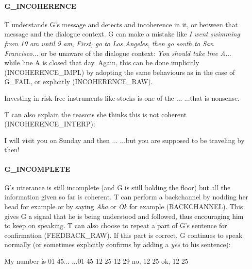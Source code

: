 				\paragraph{G\_INCOHERENCE} T understands G's message and detects and incoherence in it, or between that message and the dialogue context. G can make a mistake like \textit{I went swimming from 10 am until 9 am}, \textit{First, go to Los Angeles, then go south to San Francisco...} or be unaware of the dialogue context: \textit{You should take line A...} while line A is closed that day. Again, this can be done implicitly (INCOHERENCE\_IMPL) by adopting the same behaviours as in the case of G\_FAIL, or explicitly (INCOHERENCE\_RAW).
					
						\begin{dialogue}
							 Investing in risk-free instruments like stocks is one of the ...
							 ...that is nonsense.
						\end{dialogue}
						
						T can also explain the reasons she thinks this is not coherent (INCOHERENCE\_INTERP):
						
						\begin{dialogue}
							 I will visit you on Sunday and then ...
							 ...but you are supposed to be traveling by then!
						\end{dialogue}
						
					\paragraph{G\_INCOMPLETE} G's utterance is still incomplete (and G is still holding the floor) but all the information given so far is coherent. T can perform a backchannel by nodding her head for example or by saying \textit{Aha} or \textit{Ok} for example (BACKCHANNEL). This gives G a signal that he is being understood and followed, thus encouraging him to keep on speaking. T can also choose to repeat a part of G's sentence for confirmation (FEEDBACK\_RAW). If this part is correct, G continues to speak normally (or sometimes explicitly confirms by adding a \textit{yes} to his sentence):
					
						\begin{dialogue}
							 My number is 01 45...
							\speak{T} ...01 45
							\speak{G} 12 25
							\speak{T} 12 29
							\speak{G} no, 12 25
							\speak{T} ok, 12 25
						\end{dialogue}
						
